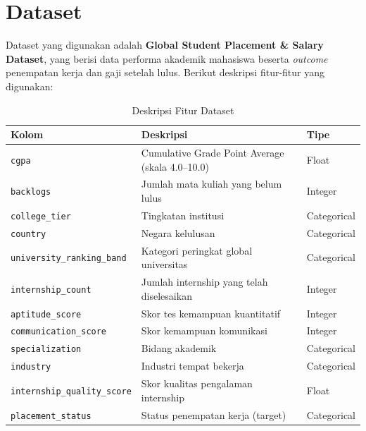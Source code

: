 \section{Dataset}
Dataset yang digunakan adalah \textbf{Global Student Placement \& Salary Dataset}, yang berisi data performa akademik mahasiswa beserta \textit{outcome} penempatan kerja dan gaji setelah lulus. Berikut deskripsi fitur-fitur yang digunakan:

\begin{table}[H]
    \centering
    \caption{Deskripsi Fitur Dataset}
    \begin{tabular}{lll}
        \toprule
        \textbf{Kolom} & \textbf{Deskripsi} & \textbf{Tipe} \\
        \midrule
        \texttt{cgpa} & Cumulative Grade Point Average (skala 4.0--10.0) & Float \\
        \texttt{backlogs} & Jumlah mata kuliah yang belum lulus & Integer \\
        \texttt{college\_tier} & Tingkatan institusi & Categorical \\
        \texttt{country} & Negara kelulusan & Categorical \\
        \texttt{university\_ranking\_band} & Kategori peringkat global universitas & Categorical \\
        \texttt{internship\_count} & Jumlah internship yang telah diselesaikan & Integer \\
        \texttt{aptitude\_score} & Skor tes kemampuan kuantitatif & Integer \\
        \texttt{communication\_score} & Skor kemampuan komunikasi & Integer \\
        \texttt{specialization} & Bidang akademik & Categorical \\
        \texttt{industry} & Industri tempat bekerja & Categorical \\
        \texttt{internship\_quality\_score} & Skor kualitas pengalaman internship & Float \\
        \texttt{placement\_status} & Status penempatan kerja (target) & Categorical \\
        \bottomrule
    \end{tabular}
    \label{tab:dataset}
\end{table}
